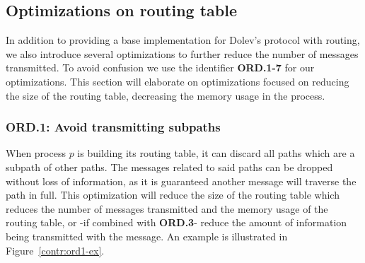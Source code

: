 \subsection{Optimizations on routing table}
In addition to providing a base implementation for Dolev's protocol with routing, we also introduce several optimizations to further reduce the number of messages transmitted. To avoid confusion we use the identifier \textbf{ORD.1-7} for our optimizations. This section will elaborate on optimizations focused on reducing the size of the routing table, decreasing the memory usage in the process.

\subsubsection{ORD.1: Avoid transmitting subpaths}
When process $p$ is building its routing table, it can discard all paths which are a subpath of other paths. The messages related to said paths can be dropped without loss of information, as it is guaranteed another message will traverse the path in full. This optimization will reduce the size of the routing table which reduces the number of messages transmitted and the memory usage of the routing table, or -if combined with \textbf{ORD.3}- reduce the amount of information being transmitted with the message. An example is illustrated in Figure~\ref{contr:ord1-ex}.

